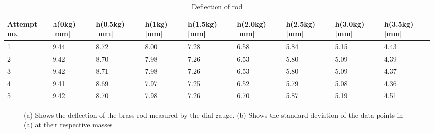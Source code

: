 \documentclass[11pt,a4paper]{article}
\begin{document}
    \begin{table}[H]
      \caption{Deflection of rod}
      \center
      \begin{tabular}{ | p{1.2cm} | p{1.4cm} | p{1.4cm} | p{1.4cm} | p{1.4cm} | p{1.4cm} | p{1.4cm} | p{1.4cm} | p{1.4cm} |}
          \hline
          Attempt no. & h(0kg) [mm] & h(0.5kg) [mm] & h(1kg) [mm] & h(1.5kg) [mm] & h(2.0kg) [mm] & h(2.5kg) [mm] & h(3.0kg) [mm] & h(3.5kg) [mm] \\ 
          \hline
          1 & 9.44 & 8.72 & 8.00 & 7.28 & 6.58 & 5.84 & 5.15 & 4.43\\ \hline
          2 & 9.42 & 8.70 & 7.98 & 7.26 & 6.53 & 5.80 & 5.09 & 4.39\\ \hline
          3 & 9.42 & 8.71 & 7.98 & 7.26 & 6.53 & 5.80 & 5.09 & 4.37\\ \hline
          4 & 9.41 & 8.69 & 7.97 & 7.25 & 6.52 & 5.79 & 5.08 & 4.36\\ \hline
          5 & 9.42 & 8.70 & 7.98 & 7.26 & 6.70 & 5.87 & 5.19 & 4.51\\ \hline
      \end{tabular}
      \label{tab:flex}
    \end{table}

   
    \begin{figure}[H]
      \centering
      \center
      \caption{(a) Shows the deflection of the brass rod measured by the dial gauge. (b) Shows the standard deviation of the data points in (a) at their respective masses}
      \label{fig:exp_1}
    \end{figure}
\end{document}
